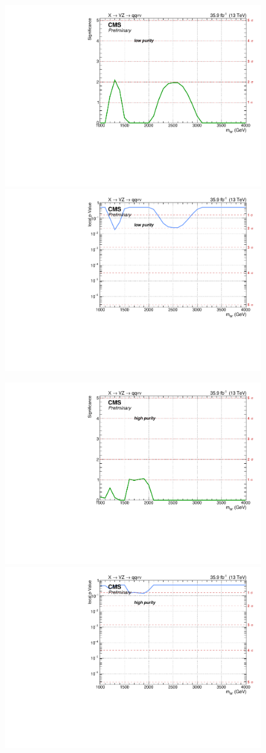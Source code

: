 \begin{figure}[!htb]
  \begin{center}
     \includegraphics[width=.495\textwidth]{v9/plotsAlpha/Limits/Significance_XWZInv_XVZnnlp.pdf}%
     \includegraphics[width=.495\textwidth]{v9/plotsAlpha/Limits/pValue_XWZInv_XVZnnlp.pdf}

     \includegraphics[width=.495\textwidth]{v9/plotsAlpha/Limits/Significance_XWZInv_XVZnnhp.pdf}%
     \includegraphics[width=.495\textwidth]{v9/plotsAlpha/Limits/pValue_XWZInv_XVZnnhp.pdf}


\end{center}
\end{figure}
